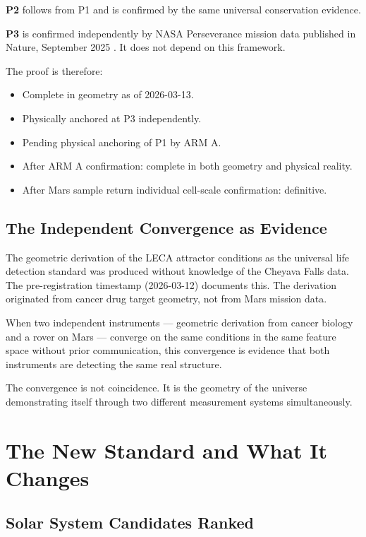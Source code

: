 \documentclass[11pt, a4paper]{article}
\begin{document}
\textbf{P2} follows from P1 and is confirmed by the same
universal conservation evidence.

\textbf{P3} is confirmed independently by NASA Perseverance
mission data published in Nature, September 2025 \cite{hurowitz2025}.
It does not depend on this framework.

The proof is therefore:

\begin{itemize}[leftmargin=*]
\item Complete in geometry as of 2026-03-13.
\item Physically anchored at P3 independently.
\item Pending physical anchoring of P1 by ARM A.
\item After ARM A confirmation: complete in both
  geometry and physical reality.
\item After Mars sample return individual cell-scale
  confirmation: definitive.
\end{itemize}

\subsection{The Independent Convergence as Evidence}

The geometric derivation of the LECA attractor
conditions as the universal life detection standard
was produced without knowledge of the Cheyava Falls
data. The pre-registration timestamp (2026-03-12)
documents this. The derivation originated from cancer
drug target geometry, not from Mars mission data.

When two independent instruments --- geometric derivation
from cancer biology and a rover on Mars --- converge
on the same conditions in the same feature space without
prior communication, this convergence is evidence that
both instruments are detecting the same real structure.

The convergence is not coincidence.
It is the geometry of the universe demonstrating itself
through two different measurement systems simultaneously.

\section{The New Standard and What It Changes}

\subsection{Solar System Candidates Ranked}
\end{document}
